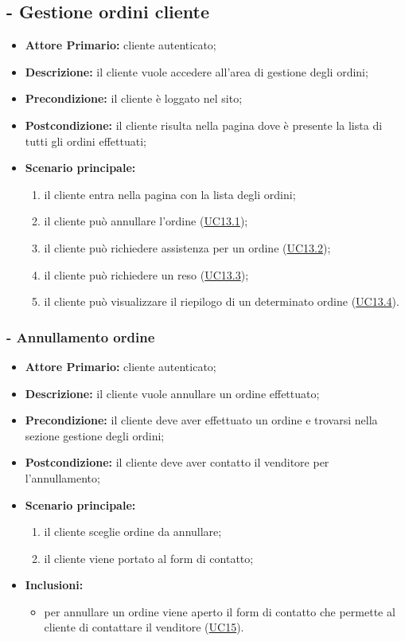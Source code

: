 \subsection{ - Gestione ordini cliente}
\begin{itemize}
    \item \textbf{Attore Primario:} cliente autenticato;
    \item \textbf{Descrizione:} il cliente vuole accedere all'area di gestione degli ordini;
    \item \textbf{Precondizione:} il cliente è loggato nel sito;
    \item \textbf{Postcondizione:} il cliente risulta nella pagina dove è presente la lista di tutti gli ordini effettuati;
    \item \textbf{Scenario principale:}
    \begin{enumerate}
        \item il cliente entra nella pagina con la lista degli ordini;
        \item il cliente può annullare l'ordine (\hyperref[UC13.1]{UC13.1});
        \item il cliente può richiedere assistenza per un ordine (\hyperref[UC13.2]{UC13.2});
        \item il cliente può richiedere un reso (\hyperref[UC13.3]{UC13.3});
        \item il cliente può visualizzare il riepilogo di un determinato ordine (\hyperref[UC13.4]{UC13.4}).
    \end{enumerate}
\end{itemize}

\stepsubUserCase
\subsubsection{ - Annullamento ordine}
\begin{itemize}
\item \textbf{Attore Primario:} cliente autenticato;
\item \textbf{Descrizione:} il cliente vuole annullare un ordine effettuato;
\item \textbf{Precondizione:} il cliente deve aver effettuato un ordine e trovarsi nella sezione gestione degli ordini;
\item \textbf{Postcondizione:} il cliente deve aver contatto il venditore per l'annullamento;
\item \textbf{Scenario principale:}
\begin{enumerate}
    \item il cliente sceglie ordine da annullare;
    \item il cliente viene portato al form di contatto;
\end{enumerate}
\item \textbf{Inclusioni:}
\begin{itemize}
    \item per annullare un ordine viene aperto il form di contatto che permette al cliente di contattare il venditore (\hyperref[UC15]{UC15}).
\end{itemize}
\end{itemize}

